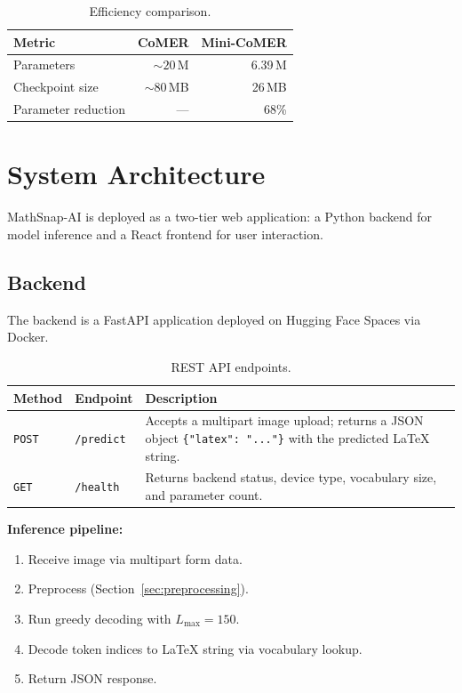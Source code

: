 \documentclass[11pt,a4paper]{article}
\begin{document}
\begin{table}[H]
\centering
\caption{Efficiency comparison.}
\label{tab:efficiency}
\begin{tabular}{lrr}
\toprule
\textbf{Metric} & \textbf{CoMER} & \textbf{Mini-CoMER} \\
\midrule
Parameters            & ${\sim}20$\,M & 6.39\,M \\
Checkpoint size       & ${\sim}80$\,MB & 26\,MB \\
Parameter reduction   & ---          & 68\% \\
\bottomrule
\end{tabular}
\end{table}

\section{System Architecture}
\label{sec:system}

MathSnap-AI is deployed as a two-tier web application: a Python backend for model inference and a React frontend for user interaction.

\subsection{Backend}

The backend is a FastAPI application deployed on Hugging Face Spaces via Docker.

\begin{table}[H]
\centering
\caption{REST API endpoints.}
\label{tab:api}
\begin{tabular}{llp{7cm}}
\toprule
\textbf{Method} & \textbf{Endpoint} & \textbf{Description} \\
\midrule
\texttt{POST} & \texttt{/predict} & Accepts a multipart image upload; returns a JSON object \texttt{\{"latex": "..."\}} with the predicted \LaTeX{} string. \\
\texttt{GET}  & \texttt{/health}  & Returns backend status, device type, vocabulary size, and parameter count. \\
\bottomrule
\end{tabular}
\end{table}

\textbf{Inference pipeline:}
\begin{enumerate}[nosep]
  \item Receive image via multipart form data.
  \item Preprocess (Section~\ref{sec:preprocessing}).
  \item Run greedy decoding with $L_{\max} = 150$.
  \item Decode token indices to \LaTeX{} string via vocabulary lookup.
  \item Return JSON response.
\end{enumerate}
\end{document}
